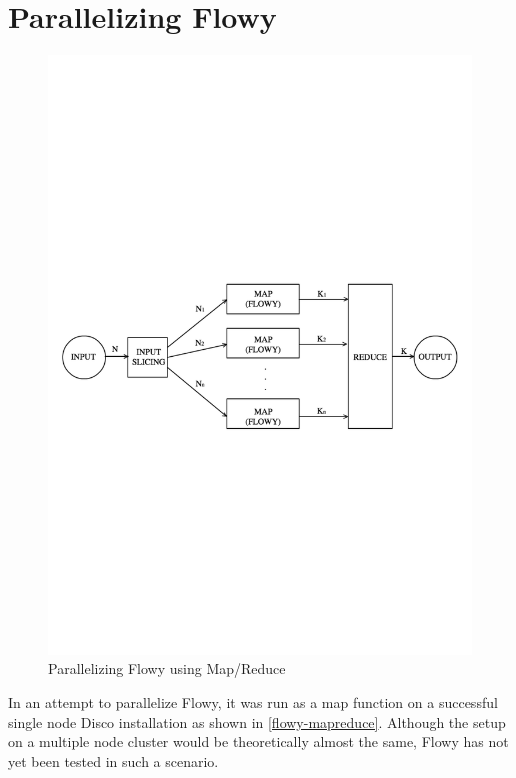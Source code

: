 \section{Parallelizing Flowy}\label{sec:parallel-flowy}
\begin{figure}[h!]
\begin{center}
  \includegraphics* [width=1.0\linewidth]{figures/flowy-mapreduce}	
  \caption{Parallelizing Flowy using Map/Reduce \cite{pnemeth:thesis:2010}}
  \label{fig:flowy-mapreduce}
\end{center}
\end{figure}
In an attempt to parallelize Flowy, it was run as a map function on a successful single node Disco installation as shown in \ref{flowy-mapreduce}. Although the setup on a multiple node cluster would be theoretically almost the same, Flowy has not yet been tested in such a scenario.
	
